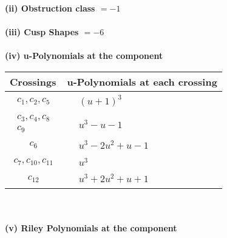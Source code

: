 \documentclass[1p]{elsarticle_modified}
\theoremstyle{definition}
\begin{document}
\flushleft \textbf{(ii) Obstruction class $= -1$}\\~\\
\flushleft \textbf{(iii) Cusp Shapes $= -6$}\\~\\
\newpage\renewcommand{\arraystretch}{1}
\flushleft \textbf{(iv) u-Polynomials at the component}\newline \\
\begin{tabular}{m{50pt}|m{274pt}}
Crossings & \hspace{64pt}u-Polynomials at each crossing \\
\hline $$\begin{aligned}c_{1},c_{2},c_{5}\end{aligned}$$&$\begin{aligned}
&(u+1)^3
\end{aligned}$\\
\hline $$\begin{aligned}c_{3},c_{4},c_{8}\\c_{9}\end{aligned}$$&$\begin{aligned}
&u^3- u-1
\end{aligned}$\\
\hline $$\begin{aligned}c_{6}\end{aligned}$$&$\begin{aligned}
&u^3-2 u^2+u-1
\end{aligned}$\\
\hline $$\begin{aligned}c_{7},c_{10},c_{11}\end{aligned}$$&$\begin{aligned}
&u^3
\end{aligned}$\\
\hline $$\begin{aligned}c_{12}\end{aligned}$$&$\begin{aligned}
&u^3+2 u^2+u+1
\end{aligned}$\\
\hline
\end{tabular}\\~\\
\newpage\renewcommand{\arraystretch}{1}
\flushleft \textbf{(v) Riley Polynomials at the component}\newline \\
\end{document}

